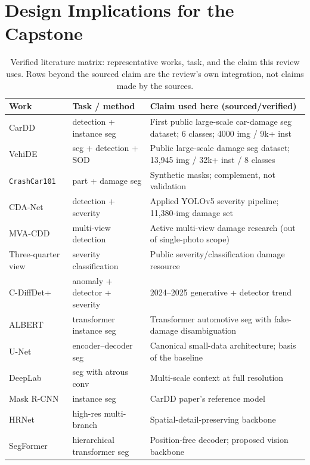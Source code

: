 \documentclass[conference]{IEEEtran}
\begin{document}
\section{Design Implications for the Capstone}
\begin{table}[!t]
\setlength{\tabcolsep}{4.5pt}
\renewcommand{\arraystretch}{1.15}
\caption{Verified literature matrix: representative works, task, and the claim
this review uses. Rows beyond the sourced claim are the review's own
integration, not claims made by the sources.}
\label{tab:matrix}
\centering
\begin{tabular}{@{}p{2.0cm}p{2.0cm}p{3.6cm}@{}}
\toprule
\textbf{Work} & \textbf{Task / method} & \textbf{Claim used here (sourced/verified)}\\
\midrule
CarDD \cite{cardd2023} & detection + instance seg & First public large-scale car-damage seg dataset; 6 classes; 4000 img / 9k+ inst\\
VehiDE \cite{vehide2023,vehide2025} & seg + detection + SOD & Public large-scale damage seg dataset; 13,945 img / 32k+ inst / 8 classes\\
\texttt{CrashCar101} \cite{crashcar101} & part + damage seg & Synthetic masks; complement, not validation\\
CDA-Net \cite{cdanet2023} & detection + severity & Applied YOLOv5 severity pipeline; 11,380-img damage set\\
MVA-CDD \cite{mvacdd2025} & multi-view detection & Active multi-view damage research (out of single-photo scope)\\
Three-quarter view \cite{threequarter2024} & severity classification & Public severity/classification damage resource\\
C-DiffDet+ \cite{cdiffdet2025} & anomaly + detector + severity & 2024--2025 generative + detector trend\\
ALBERT \cite{albert2025} & transformer instance seg & Transformer automotive seg with fake-damage disambiguation\\
U-Net \cite{unet2015} & encoder--decoder seg & Canonical small-data architecture; basis of the baseline\\
DeepLab \cite{deeplabv3} & seg with atrous conv & Multi-scale context at full resolution\\
Mask R-CNN \cite{maskrcnn2017} & instance seg & CarDD paper's reference model\\
HRNet \cite{hrnet2020} & high-res multi-branch & Spatial-detail-preserving backbone\\
SegFormer \cite{segformer2021} & hierarchical transformer seg & Position-free decoder; proposed vision backbone\\

\end{tabular}
\end{table}
\end{document}
